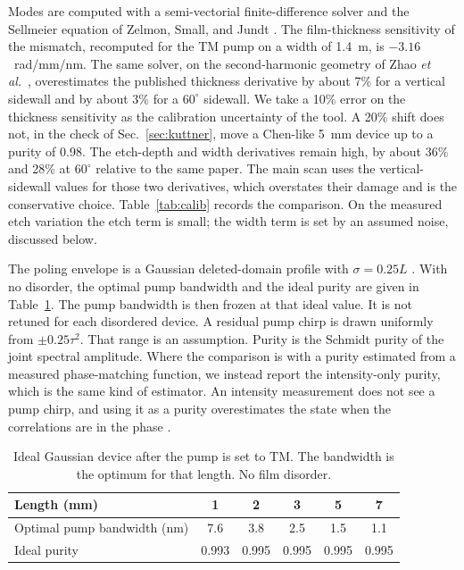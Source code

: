 \documentclass[11pt,a4paper]{article}
\begin{document}
Modes are computed with a semi-vectorial finite-difference solver and the Sellmeier equation of Zelmon, Small, and Jundt \cite{Zelmon1997}.
The film-thickness sensitivity of the mismatch, recomputed for the TM pump on a width of 1.4~\textmu m, is $-3.16$~rad/mm/nm.
The same solver, on the second-harmonic geometry of Zhao \emph{et al.}\ \cite{ZhaoLu2023}, overestimates the published thickness derivative by about 7\% for a vertical sidewall and by about 3\% for a $60^{\circ}$ sidewall.
We take a 10\% error on the thickness sensitivity as the calibration uncertainty of the tool.
A 20\% shift does not, in the check of Sec.~\ref{sec:kuttner}, move a Chen-like 5~mm device up to a purity of 0.98.
The etch-depth and width derivatives remain high, by about 36\% and 28\% at $60^{\circ}$ relative to the same paper.
The main scan uses the vertical-sidewall values for those two derivatives, which overstates their damage and is the conservative choice.
Table~\ref{tab:calib} records the comparison.
On the measured etch variation the etch term is small; the width term is set by an assumed noise, discussed below.

The poling envelope is a Gaussian deleted-domain profile with $\sigma=0.25L$ \cite{Tambasco2016}.
With no disorder, the optimal pump bandwidth and the ideal purity are given in Table~\ref{tab:ideal}.
The pump bandwidth is then frozen at that ideal value.
It is not retuned for each disordered device.
A residual pump chirp is drawn uniformly from $\pm 0.25\tau^{2}$.
That range is an assumption.
Purity is the Schmidt purity of the joint spectral amplitude.
Where the comparison is with a purity estimated from a measured phase-matching function, we instead report the intensity-only purity, which is the same kind of estimator.
An intensity measurement does not see a pump chirp, and using it as a purity overestimates the state when the correlations are in the phase \cite{Graffitti2018}.

\begin{table}[t]
\centering
\caption{Ideal Gaussian device after the pump is set to TM.
The bandwidth is the optimum for that length.
No film disorder.}
\label{tab:ideal}
\begin{tabular}{lccccc}
\toprule
Length (mm) & 1 & 2 & 3 & 5 & 7 \\
\midrule
Optimal pump bandwidth (nm) & 7.6 & 3.8 & 2.5 & 1.5 & 1.1 \\
Ideal purity & 0.993 & 0.995 & 0.995 & 0.995 & 0.995 \\
\bottomrule
\end{tabular}
\end{table}
\end{document}
